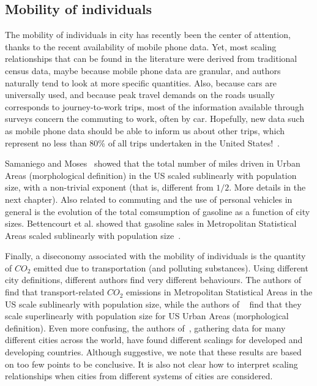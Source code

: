 \subsection{Mobility of individuals}
\label{sub:mobility}

The mobility of individuals in city has recently been the center of attention,
thanks to the recent availability of mobile phone data. Yet, most scaling
relationships that can be found in the literature were derived from traditional
census data, maybe because mobile phone data are granular, and authors naturally
tend to look at more specific quantities.
Also, because cars are universally used, and because peak travel demands on the
roads usually corresponds to journey-to-work trips, most of the information
available through surveys concern the commuting to work, often by car.
Hopefully, new data such as mobile phone data should be able to inform us about
other trips, which represent no less than 80\% of all trips undertaken in the
United States!~\cite{FHWA-PL-11-022}.

Samaniego and Moses~\cite{Samaniego:2008} showed that the total number of miles
driven in Urban Areas (morphological definition) in the US scaled sublinearly
with population size, with a non-trivial exponent (that is, different from
$1/2$. More details in the next chapter).  Also related to commuting and the use of
personal vehicles in general is the evolution of the total comsumption of
gasoline as a function of city sizes. Bettencourt et al. showed that gasoline
sales in Metropolitan Statistical Areas scaled sublinearly with population
size~\cite{Bettencourt:2007}. 

Finally, a diseconomy associated with the mobility of individuals is the
quantity of $CO_2$ emitted due to transportation (and polluting substances).
Using different city definitions, different authors find very different
behaviours. The authors of \cite{Fragkias:2013} find that transport-related
$CO_2$ emissions in Metropolitan Statistical Areas in the US scale sublinearly
with population size, while the authors of
~\cite{Louf:2014_mobility,Oliveira:2014} find that they scale superlinearly with
population size for US Urban Areas (morphological definition). Even more
confusing, the authors of~\cite{Rybksi:2013}, gathering data for many different
cities across the world, have found different scalings for developed and
developing countries. Although suggestive, we note that these results are based
on too few points to be conclusive. It is also not clear how to interpret
scaling relationships when cities from different systems of cities are
considered.


